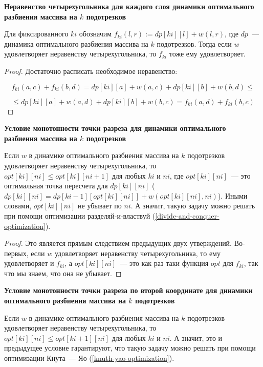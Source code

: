 \begin{proposition} \textbf{Неравенство четырехугольника для каждого слоя динамики оптимального разбиения массива на $k$ подотрезков}
    
    Для фиксированного $ki$ обозначим $f_{ki}(l, r) := dp[ki][l] + w(l, r)$, где $dp$~--- динамика оптимального разбиения массива на $k$ подотрезков. Тогда если $w$ удовлетворяет неравенству четырехугольника, то $f_{ki}$ тоже ему удовлетворяет.
\end{proposition}

\begin{proof}
     Достаточно расписать необходимое неравенство:

     $$f_{ki}(a, c) + f_{ki}(b, d) = dp[ki][a] + w(a, c) + dp[ki][b] + w(b, d) \le $$

     $$ \le dp[ki][a] + w(a, d) + dp[ki][b] + w(b, c) = f_{ki}(a, d) + f_{ki}(b, c)$$
\end{proof}

\begin{corollary} \textbf{Условие монотонности точки разреза для динамики оптимального разбиения массива на $k$ подотрезков}

    Если $w$ в динамике оптимального разбиения массива на $k$ подотрезков удовлетворяет неравенству четырехугольника, то $opt[ki][ni] \le opt[ki][ni + 1]$ для любых $ki$ и $ni$, где $opt[ki][ni]$~--- это оптимальная точка пересчета для $dp[ki][ni]$ ($dp[ki][ni] = dp[ki - 1][opt[ki][ni]] + w(opt[ki][ni], ni)$). Иными словами, $opt[ki][ni]$ не убывает по $ni$. А значит, такую задачу можно решать при помощи оптимизации разделяй-и-властвуй (\ref{divide-and-conquer-optimization}).
\end{corollary}

\begin{proof}
    Это является прямым следствием предыдущих двух утверждений. Во-первых, если $w$ удовлетворяет неравенству четырехугольника, то ему удовлетворяет и $f_{ki}$, а $opt[ki][ni]$~--- это как раз таки функция $opt$ для $f_{ki}$, так что мы знаем, что она не убывает.
\end{proof}

\begin{proposition} \textbf{Условие монотонности точки разреза по второй координате для динамики оптимального разбиения массива на $k$ подотрезков}
    
    Если $w$ в динамике оптимального разбиения массива на $k$ подотрезков удовлетворяет неравенству четырехугольника, то $opt[ki][ni] \le opt[ki + 1][ni]$ для любых $ki$ и $ni$. А значит, это и предыдущее условие гарантируют, что такую задачу можно решать при помощи оптимизации Кнута~--- Яо (\ref{knuth-yao-optimization}).
\end{proposition}

